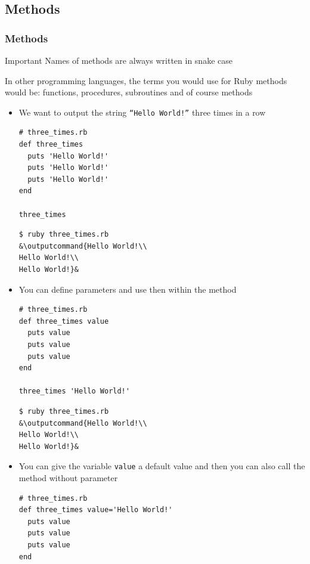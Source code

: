 \documentclass{beamer}
\newcommand{\outputcommand}[1]{\color{darkgreen}{#1}}
\begin{document}
\subsection{Methods}
\begin{frame}
\frametitle{Methods}
\begin{block}{Important}
\alert{Names of methods are always written in snake case}
\end{block}

In other programming languages, the terms you would use for Ruby methods would be: functions, procedures, subroutines and of course methods

\begin{itemize}

\item We want to output the string \texttt{``Hello World!''} three times in a row
\lstset{language=Ruby, style=eclipse}
\begin{lstlisting}[escapechar=&]
# three_times.rb
def three_times
  puts 'Hello World!'
  puts 'Hello World!'
  puts 'Hello World!'
end

three_times
\end{lstlisting}


\lstset{language=shell}
\begin{lstlisting}[numbers=none, escapechar=&]
$ ruby three_times.rb
&\outputcommand{Hello World!\\
Hello World!\\
Hello World!}&
\end{lstlisting}

\item You can define parameters and use then within the method

\lstset{language=Ruby, style=eclipse}
\begin{lstlisting}[escapechar=&]
# three_times.rb
def three_times value
  puts value
  puts value
  puts value
end

three_times 'Hello World!'
\end{lstlisting}


\lstset{language=shell}
\begin{lstlisting}[numbers=none, escapechar=&]
$ ruby three_times.rb
&\outputcommand{Hello World!\\
Hello World!\\
Hello World!}&
\end{lstlisting}

\item You can give the variable \texttt{value} a default value and then you can also call the method without parameter
\lstset{language=Ruby, style=eclipse}
\begin{lstlisting}[escapechar=&]
# three_times.rb
def three_times value='Hello World!'
  puts value
  puts value
  puts value
end


\end{lstlisting}
\end{itemize}
\end{frame}
\end{document}
